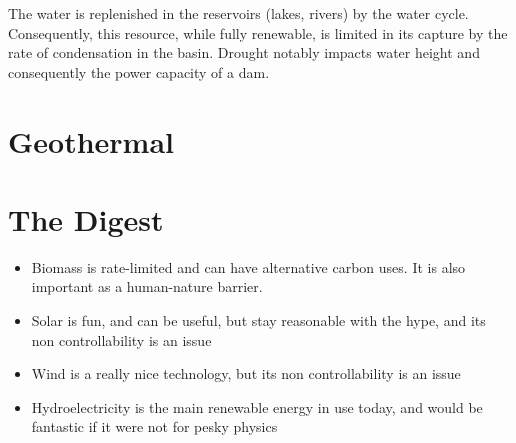 The water is replenished in the reservoirs (lakes, rivers) by the water cycle. Consequently, this resource, while fully renewable, is limited in its capture by the rate of condensation in the basin. Drought notably impacts water height and consequently the power capacity of a dam.

\section{Geothermal}

\blindtext


\blindtext


\section{The Digest}


\begin{kaoboxgreen}[frametitle=Main Takeaways]

\begin{itemize}
\item Biomass is rate-limited and can have alternative carbon uses. It is also important as a human-nature barrier.
\item Solar is fun, and can be useful, but stay reasonable with the hype, and its non controllability is an issue
\item Wind is a really nice technology, but its non controllability is an issue
\item Hydroelectricity is the main renewable energy in use today, and would be fantastic if it were not for pesky physics
\end{itemize}
  
\end{kaoboxgreen}